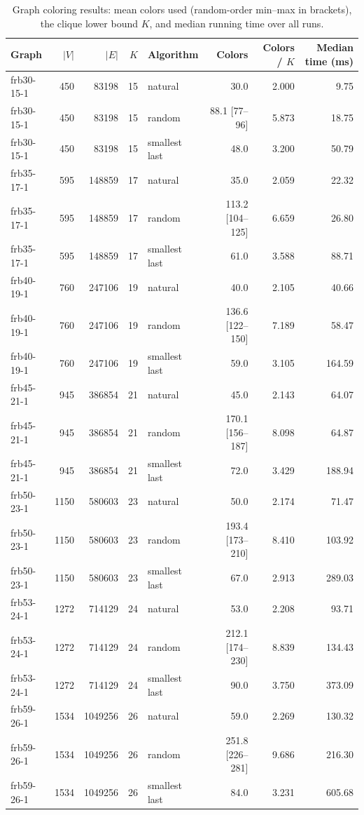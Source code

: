 \begin{table}[t]
  \caption{Graph coloring results: mean colors used (random-order min--max in brackets), the clique lower bound $K$, and median running time over all runs.}
  \label{tab:coloring}
  \small
  \begin{tabular}{lrrrlrrr}
    \toprule
    Graph & $|V|$ & $|E|$ & $K$ & Algorithm & Colors & Colors / $K$ & Median time (ms) \\
    \midrule
    frb30-15-1 & 450 & 83198 & 15 & natural & 30.0 & 2.000 & 9.75 \\
    frb30-15-1 & 450 & 83198 & 15 & random & 88.1 [77--96] & 5.873 & 18.75 \\
    frb30-15-1 & 450 & 83198 & 15 & smallest last & 48.0 & 3.200 & 50.79 \\
    frb35-17-1 & 595 & 148859 & 17 & natural & 35.0 & 2.059 & 22.32 \\
    frb35-17-1 & 595 & 148859 & 17 & random & 113.2 [104--125] & 6.659 & 26.80 \\
    frb35-17-1 & 595 & 148859 & 17 & smallest last & 61.0 & 3.588 & 88.71 \\
    frb40-19-1 & 760 & 247106 & 19 & natural & 40.0 & 2.105 & 40.66 \\
    frb40-19-1 & 760 & 247106 & 19 & random & 136.6 [122--150] & 7.189 & 58.47 \\
    frb40-19-1 & 760 & 247106 & 19 & smallest last & 59.0 & 3.105 & 164.59 \\
    frb45-21-1 & 945 & 386854 & 21 & natural & 45.0 & 2.143 & 64.07 \\
    frb45-21-1 & 945 & 386854 & 21 & random & 170.1 [156--187] & 8.098 & 64.87 \\
    frb45-21-1 & 945 & 386854 & 21 & smallest last & 72.0 & 3.429 & 188.94 \\
    frb50-23-1 & 1150 & 580603 & 23 & natural & 50.0 & 2.174 & 71.47 \\
    frb50-23-1 & 1150 & 580603 & 23 & random & 193.4 [173--210] & 8.410 & 103.92 \\
    frb50-23-1 & 1150 & 580603 & 23 & smallest last & 67.0 & 2.913 & 289.03 \\
    frb53-24-1 & 1272 & 714129 & 24 & natural & 53.0 & 2.208 & 93.71 \\
    frb53-24-1 & 1272 & 714129 & 24 & random & 212.1 [174--230] & 8.839 & 134.43 \\
    frb53-24-1 & 1272 & 714129 & 24 & smallest last & 90.0 & 3.750 & 373.09 \\
    frb59-26-1 & 1534 & 1049256 & 26 & natural & 59.0 & 2.269 & 130.32 \\
    frb59-26-1 & 1534 & 1049256 & 26 & random & 251.8 [226--281] & 9.686 & 216.30 \\
    frb59-26-1 & 1534 & 1049256 & 26 & smallest last & 84.0 & 3.231 & 605.68 \\
    \bottomrule
  \end{tabular}
\end{table}
